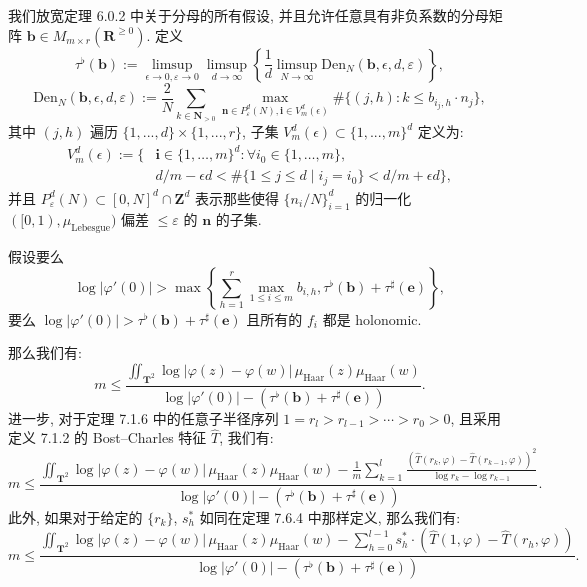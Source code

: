 \begin{theorem}\label{thm:8.0.1}
我们放宽定理 6.0.2 中关于分母的所有假设, 并且允许任意具有非负系数的分母矩阵 \(\mathbf{b} \in M_{m\times r}(\mathbf{R}^{\ge 0})\). 
定义
\begin{equation}\label{eq:8.0.2}
\tau^{\flat}(\mathbf{b}) := \limsup_{\epsilon \to 0, \varepsilon \to 0} \limsup_{d \to \infty} \left\{ \frac{1}{d} \limsup_{N \to \infty} \mathrm{Den}_{N}(\mathbf{b}, \epsilon, d, \varepsilon) \right\},
\end{equation}
\[ \mathrm{Den}_{N}(\mathbf{b}, \epsilon, d, \varepsilon) := \frac{2}{N} \sum_{k \in \mathbf{N}_{>0}} \max_{\mathbf{n} \in P_{\varepsilon}^{d}(N), \mathbf{i} \in V_{m}^{d}(\epsilon)} \#\{(j, h) : k \leq b_{i_{j}, h} \cdot n_{j}\}, \]
其中 \((j, h)\) 遍历 \(\{1, . . . , d\} \times \{1, . . . , r\}\), 
子集 \(V_m^d(\epsilon) \subset \{1, . . . , m\}^d\) 定义为:
\[
\begin{aligned}
V_m^d(\epsilon) := \big\{ &\mathbf{i} \in \{1, \dots, m\}^d : \forall i_0 \in \{1, \dots, m\}, \\
& d/m - \epsilon d < \#\{1 \le j \le d \mid i_j = i_0\} < d/m + \epsilon d \big\},
\end{aligned}
\]
并且 \(P_{\varepsilon}^{d}(N) \subset [0, N]^{d} \cap \mathbf{Z}^{d}\) 表示那些使得 \(\{n_{i}/N\}_{i=1}^{d}\) 的归一化 \(([0, 1), \mu_{\text{Lebesgue}})\) 偏差 \(\leq \varepsilon\) 的 \(\mathbf{n}\) 的子集.

假设要么
\[ \log |\varphi'(0)| > \max \left\{ \sum_{h=1}^r \max_{1 \leq i \leq m} b_{i,h}, \tau^{\flat}(\mathbf{b}) + \tau^{\sharp}(\mathbf{e}) \right\}, \]
要么 \(\log |\varphi'(0)| > \tau^{\flat}(\mathbf{b}) + \tau^{\sharp}(\mathbf{e})\) 且所有的 \(f_i\) 都是 holonomic.

那么我们有:
\begin{equation}\label{eq:8.0.3}
m \le \frac{\iint_{\mathbf{T}^2} \log |\varphi(z) - \varphi(w)| \, \mu_{\mathrm{Haar}}(z) \mu_{\mathrm{Haar}}(w)}{\log |\varphi'(0)| - (\tau^{\flat}(\mathbf{b}) + \tau^{\sharp}(\mathbf{e}))}.
\end{equation}
进一步, 对于定理 7.1.6 中的任意子半径序列 \(1 = r_l > r_{l-1} > \cdots > r_0 > 0\), 
且采用定义 7.1.2 的 Bost--Charles 特征 \(\widehat{T}\), 我们有:
\begin{equation}\label{eq:8.0.4}
m \leq \frac{\iint_{\mathbf{T}^2} \log |\varphi(z) - \varphi(w)| \, \mu_{\mathrm{Haar}}(z) \mu_{\mathrm{Haar}}(w) - \frac{1}{m} \sum_{k=1}^l \frac{(\widehat{T}(r_k, \varphi) - \widehat{T}(r_{k-1}, \varphi))^2}{\log r_k - \log r_{k-1}}}{\log |\varphi'(0)| - (\tau^{\flat}(\mathbf{b}) + \tau^{\sharp}(\mathbf{e}))}.
\end{equation}
此外, 如果对于给定的 \(\{r_k\}\), \(s_h^*\) 如同在定理 7.6.4 中那样定义, 那么我们有:
\begin{equation}\label{eq:8.0.5}
m \leq \frac{\iint_{\mathbf{T}^2} \log |\varphi(z) - \varphi(w)| \, \mu_{\mathrm{Haar}}(z) \mu_{\mathrm{Haar}}(w) - \sum_{h=0}^{l-1} s_h^* \cdot (\widehat{T}(1, \varphi) - \widehat{T}(r_h, \varphi))}{\log |\varphi'(0)| - (\tau^{\flat}(\mathbf{b}) + \tau^{\sharp}(\mathbf{e}))}.
\end{equation}
\end{theorem}

